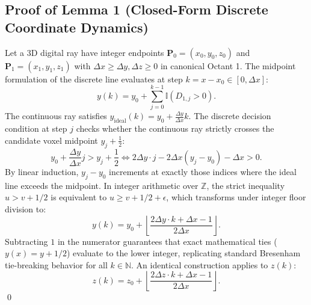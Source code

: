 \documentclass[11pt]{article}
\begin{document}
\subsection{Proof of Lemma 1 (Closed-Form Discrete Coordinate Dynamics)}
Let a 3D digital ray have integer endpoints $\mathbf{P}_0 = (x_0, y_0, z_0)$ and $\mathbf{P}_1 = (x_1, y_1, z_1)$ with $\Delta x \ge \Delta y, \Delta z \ge 0$ in canonical Octant 1.
The midpoint formulation of the discrete line evaluates at step $k = x - x_0 \in [0, \Delta x]$:
\begin{equation}
    y(k) = y_0 + \sum_{j=0}^{k-1} \mathbb{I}(D_{1,j} > 0).
\end{equation}
The continuous ray satisfies $y_{\mathrm{ideal}}(k) = y_0 + \frac{\Delta y}{\Delta x}k$. The discrete decision condition at step $j$ checks whether the continuous ray strictly crosses the candidate voxel midpoint $y_j + \frac{1}{2}$:
\begin{equation}
    y_0 + \frac{\Delta y}{\Delta x}j > y_j + \frac{1}{2} \iff 2\Delta y \cdot j - 2\Delta x (y_j - y_0) - \Delta x > 0.
\end{equation}
By linear induction, $y_j - y_0$ increments at exactly those indices where the ideal line exceeds the midpoint. In integer arithmetic over $\mathbb{Z}$, the strict inequality $u > v + 1/2$ is equivalent to $u \ge v + 1/2 + \epsilon$, which transforms under integer floor division to:
\begin{equation}
    y(k) = y_0 + \left\lfloor \frac{2\Delta y \cdot k + \Delta x - 1}{2\Delta x} \right\rfloor.
\end{equation}
Subtracting $1$ in the numerator guarantees that exact mathematical ties ($y(x) = y + 1/2$) evaluate to the lower integer, replicating standard Bresenham tie-breaking behavior for all $k \in \mathbb{N}$. An identical construction applies to $z(k)$:
\begin{equation}
    z(k) = z_0 + \left\lfloor \frac{2\Delta z \cdot k + \Delta x - 1}{2\Delta x} \right\rfloor.
\end{equation}
\qed
\end{document}
